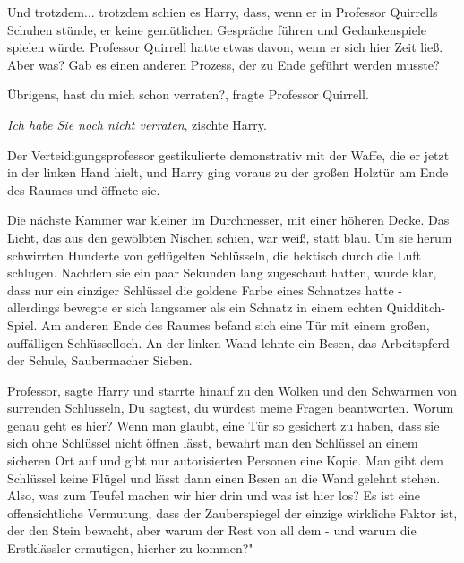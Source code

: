 Und trotzdem... trotzdem schien es Harry, dass, wenn er in Professor Quirrells
Schuhen stünde, er keine gemütlichen Gespräche führen und Gedankenspiele spielen
würde. Professor Quirrell hatte etwas davon, wenn er sich hier Zeit ließ. Aber
was? Gab es einen anderen Prozess, der zu Ende geführt werden musste?

\glqq Übrigens, hast du mich schon verraten?\grqq{}, fragte Professor Quirrell.

\glqq \emph{Ich habe Sie noch nicht verraten}\grqq{}, zischte Harry.

Der Verteidigungsprofessor gestikulierte demonstrativ mit der Waffe, die er
jetzt in der linken Hand hielt, und Harry ging voraus zu der großen Holztür am
Ende des Raumes und öffnete sie.

Die nächste Kammer war kleiner im Durchmesser, mit einer höheren Decke. Das
Licht, das aus den gewölbten Nischen schien, war weiß, statt blau. Um sie herum
schwirrten Hunderte von geflügelten Schlüsseln, die hektisch durch die Luft
schlugen. Nachdem sie ein paar Sekunden lang zugeschaut hatten, wurde klar, dass
nur ein einziger Schlüssel die goldene Farbe eines Schnatzes hatte - allerdings
bewegte er sich langsamer als ein Schnatz in einem echten Quidditch-Spiel. Am
anderen Ende des Raumes befand sich eine Tür mit einem großen, auffälligen
Schlüsselloch. An der linken Wand lehnte ein Besen, das Arbeitspferd der Schule,
Saubermacher Sieben.

\glqq Professor\grqq{}, sagte Harry und starrte hinauf zu den Wolken und den
Schwärmen von surrenden Schlüsseln, \glqq Du sagtest, du würdest meine Fragen
beantworten. Worum genau geht es hier? Wenn man glaubt, eine Tür so gesichert zu
haben, dass sie sich ohne Schlüssel nicht öffnen lässt, bewahrt man den
Schlüssel an einem sicheren Ort auf und gibt nur autorisierten Personen eine
Kopie. Man gibt dem Schlüssel keine Flügel und lässt dann einen Besen an die
Wand gelehnt stehen. Also, was zum Teufel machen wir hier drin und was ist hier
los? Es ist eine offensichtliche Vermutung, dass der Zauberspiegel der einzige
wirkliche Faktor ist, der den Stein bewacht, aber warum der Rest von all dem -
und warum die Erstklässler ermutigen, hierher zu kommen?"

